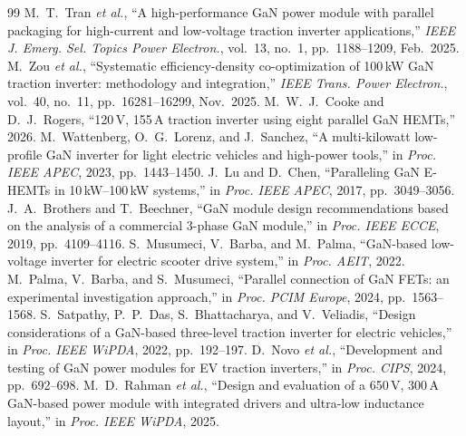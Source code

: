 \documentclass[10pt,a4paper]{article}
\begin{document}
\begin{thebibliography}{99}\small
{} M.~T.~Tran \emph{et al.}, ``A high-performance GaN power module with parallel packaging for high-current and low-voltage traction inverter applications,'' \emph{IEEE J. Emerg. Sel. Topics Power Electron.}, vol.~13, no.~1, pp.~1188--1209, Feb.~2025.
 M.~Zou \emph{et al.}, ``Systematic efficiency-density co-optimization of 100\,kW GaN traction inverter: methodology and integration,'' \emph{IEEE Trans. Power Electron.}, vol.~40, no.~11, pp.~16281--16299, Nov.~2025.
 M.~W.~J.~Cooke and D.~J.~Rogers, ``120\,V, 155\,A traction inverter using eight parallel GaN HEMTs,'' 2026.
 M.~Wattenberg, O.~G.~Lorenz, and J.~Sanchez, ``A multi-kilowatt low-profile GaN inverter for light electric vehicles and high-power tools,'' in \emph{Proc. IEEE APEC}, 2023, pp.~1443--1450.
 J.~Lu and D.~Chen, ``Paralleling GaN E-HEMTs in 10\,kW--100\,kW systems,'' in \emph{Proc. IEEE APEC}, 2017, pp.~3049--3056.
 J.~A.~Brothers and T.~Beechner, ``GaN module design recommendations based on the analysis of a commercial 3-phase GaN module,'' in \emph{Proc. IEEE ECCE}, 2019, pp.~4109--4116.
 S.~Musumeci, V.~Barba, and M.~Palma, ``GaN-based low-voltage inverter for electric scooter drive system,'' in \emph{Proc. AEIT}, 2022.
 M.~Palma, V.~Barba, and S.~Musumeci, ``Parallel connection of GaN FETs: an experimental investigation approach,'' in \emph{Proc. PCIM Europe}, 2024, pp.~1563--1568.
 S.~Satpathy, P.~P.~Das, S.~Bhattacharya, and V.~Veliadis, ``Design considerations of a GaN-based three-level traction inverter for electric vehicles,'' in \emph{Proc. IEEE WiPDA}, 2022, pp.~192--197.
 D.~Novo \emph{et al.}, ``Development and testing of GaN power modules for EV traction inverters,'' in \emph{Proc. CIPS}, 2024, pp.~692--698.
 M.~D.~Rahman \emph{et al.}, ``Design and evaluation of a 650\,V, 300\,A GaN-based power module with integrated drivers and ultra-low inductance layout,'' in \emph{Proc. IEEE WiPDA}, 2025.
\end{thebibliography}
\end{document}
